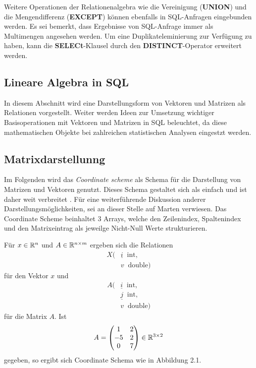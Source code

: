 Weitere Operationen der Relationenalgebra wie die Vereinigung (\textbf{UNION}) und die Mengendifferenz (\textbf{EXCEPT}) können ebenfalls in SQL-Anfragen eingebunden werden. Es sei bemerkt, dass Ergebnisse von SQL-Anfrage immer als Multimengen angesehen werden. Um eine Duplikateleminierung zur Verfügung zu haben, kann die \textbf{SELECt}-Klausel durch den \textbf{DISTINCT}-Operator erweitert werden.  


\subsection{Lineare Algebra in SQL}
\label{linalgsql}
In diesem Abschnitt wird eine Darstellungsform von Vektoren und Matrizen als Relationen vorgestellt. Weiter werden Ideen zur Umsetzung wichtiger Basisoperationen mit Vektoren und Matrizen in SQL beleuchtet, da diese mathematischen Objekte bei zahlreichen statistischen Analysen eingestzt werden.
\subsection{Matrixdarstellunng}
Im Folgenden wird das \textit{Coordinate scheme} \cite{martendiss} als Schema für die Darstellung  von Matrizen und Vektoren genutzt. Dieses Schema gestaltet sich als einfach und ist daher weit verbreitet \cite{saad1990sparskit}.
Für eine weiterführende Diskussion anderer Darstellungsmöglichkeiten, sei an dieser Stelle auf Marten \cite{martendiss} verwiesen. 
Das Coordinate Scheme beinhaltet 3 Arrays, welche den Zeilenindex, Spaltenindex und den Matrixeintrag als jeweilge Nicht-Null Werte strukturieren. 
\begin{bsp}
    \label{besipiel:_coordinate_sheme}
    Für $x \in \mathbb{R}^n$ und $A \in \mathbb{R}^{n \times m}$ ergeben sich die Relationen
    \begin{align*}
        X( &\underline{i} \; \; \mathrm{int}, \\
        &v \; \; \mathrm{double})
    \end{align*}
    für den Vektor $x$ und
    \begin{align*}
        A( &\underline{i} \; \; \mathrm{int}, \\
        &\underline{j} \; \;\mathrm{int},\\
        &v \; \; \mathrm{double})
    \end{align*} für die Matrix $A$.
    Ist
    \begin{equation*}
        A=\begin{pmatrix}
            1 & 2 \\
            -5 & 2 \\
            0 & 7 \\
        \end{pmatrix}
        \in \mathbb{R}^{3 \times 2}
    \end{equation*}
    gegeben, so ergibt sich Coordinate Schema wie in Abbildung 2.1.
\end{bsp}

